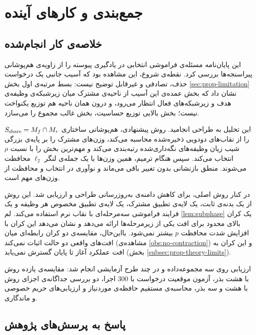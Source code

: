 \chapter{جمع‌بندی و کارهای آینده}
\label{ch:conclusions}

\section{خلاصه‌ی کار انجام‌شده}
\label{sec:concl-summary}

این پایان‌نامه مسئله‌ی فراموشی انتخابی در یادگیری پیوسته را از زاویه‌ی هم‌پوشانی پیراسنجه‌ها بررسی کرد. نقطه‌ی شروع، این مشاهده بود که آسیب جانبی یک درخواست حذف، تصادفی و غیرقابل توضیح نیست: بسط مرتبه‌ی اول بخش \ref{sec:prop-limitation} نشان داد که بخش عمده‌ی این آسیب از ناحیه‌ی مشترک میان زیرشبکه‌ی وظیفه‌ی هدف و زیرشبکه‌های فعال انتظار می‌رود، و درون همان ناحیه هم توزیع یکنواخت نیست؛ بخش بالایی توزیع حساسیت، بخش غالب مجموع را می‌سازد.

این تحلیل به طراحی  انجامید. روش پیشنهادی، هم‌پوشانی ساختاری $S_{\mathrm{share}}=M_f\cap M_r$ را از نقاب‌های دودویی ذخیره‌شده محاسبه می‌کند، وزن‌های مشترک را بر پایه‌ی بزرگی شیب زیان وظیفه‌های نگه‌داری‌شده رتبه‌بندی می‌کند و مهم‌ترین بخش را با نسبت $\rho$ انتخاب می‌کند. سپس هنگام ترمیم، همین وزن‌ها با یک جمله‌ی لنگر $\ell_2$ محافظت می‌شوند. منطق بازنشانی  بدون تغییر باقی می‌ماند و نوآوری در انتخاب و محافظت از وزن‌های مهم است.

در کنار روش اصلی،  برای کاهش دامنه‌ی به‌روزرسانی طراحی و ارزیابی شد. این روش از یک بدنه‌ی ثابت، یک لایه‌ی تطبیق مشترک، یک لایه‌ی تطبیق مخصوص هر وظیفه و یک فرایند فراموشی سه‌مرحله‌ای با نقاب نرم استفاده می‌کند. لم \ref{lem:subphase} یک کران بالای محدود برای افت یکی از زیرمرحله‌ها ارائه می‌دهد و نشان می‌دهد این کران با افزایش شدت محافظت $p$ بیشتر نمی‌شود. بااین‌حال، مقایسه‌ی دو کران رابطه‌ای میان افت‌های واقعی دو حالت اثبات نمی‌کند (مشاهده‌ی \ref{obs:no-contraction}) و این کران به افت عملکرد آغاز تا پایان گسترش نمی‌یابد (بخش \ref{subsec:prop-theory-limits}).

ارزیابی روی سه مجموعه‌داده و در چند طرح آزمایشی انجام شد: مقایسه‌ی یازده روش با هشت بذر، آزمون موقعیت درخواست با $300$ اجرا، دو بررسی جداگانه‌ی اجزای روش با هشت و سه بذر، محاسبه‌ی مستقیم حافظه‌ی موردنیاز و ارزیابی‌های حریم خصوصی و ماندگاری.

\section{پاسخ به پرسش‌های پژوهش}
\label{sec:concl-answers}

